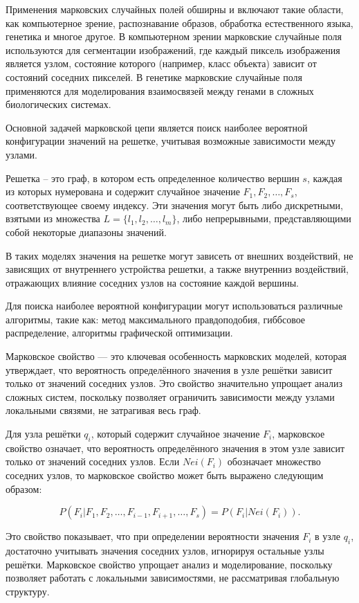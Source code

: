 Применения марковских случайных полей обширны и включают такие области, как компьютерное зрение, распознавание образов, обработка естественного языка, генетика и многое другое. В компьютерном зрении марковские случайные поля используются для сегментации изображений, где каждый пиксель изображения является узлом, состояние которого (например, класс объекта) зависит от состояний соседних пикселей. В генетике марковские случайные поля применяются для моделирования взаимосвязей между генами в сложных биологических системах.


Основной задачей марковской цепи является поиск наиболее вероятной конфигурации значений на решетке, учитывая возможные зависимости между узлами.

Решетка -- это граф, в котором есть определенное количество вершин $s$, каждая из которых нумерована и содержит случайное значение $F_1, F_2, \ldots, F_s$, соответствующее своему индексу. Эти значения могут быть либо дискретными, взятыми из множества $L = \{l_1, l_2, \ldots, l_m \}$, либо непрерывными, представляющими собой некоторые диапазоны значений.

В таких моделях значения на решетке могут зависеть от внешних воздействий, не зависящих от внутреннего устройства решетки, а также внутренниз воздействий, отражающих влияние соседних узлов на состояние каждой вершины.

Для поиска наиболее вероятной конфигурации могут использоваться различные алгоритмы, такие как: метод максимального правдоподобия, гиббсовое распределение, алгоритмы графической оптимизации.

Марковское свойство — это ключевая особенность марковских моделей, которая утверждает, что вероятность определённого значения в узле решётки зависит только от значений соседних узлов. Это свойство значительно упрощает анализ сложных систем, поскольку позволяет ограничить зависимости между узлами локальными связями, не затрагивая весь граф.

Для узла решётки $q_i$, который содержит случайное значение $F_i$, марковское свойство означает, что вероятность определённого значения в этом узле зависит только от значений соседних узлов. Если $Nei(F_i)$ обозначает множество соседних узлов, то марковское свойство может быть выражено следующим образом:

$$P(F_i | F_1, F_2, \ldots, F_{i-1}, F_{i+1}, \ldots, F_s) = P(F_i | Nei(F_i)).$$

Это свойство показывает, что при определении вероятности значения $F_i$ в узле $q_i$, достаточно учитывать значения соседних узлов, игнорируя остальные узлы решётки. Марковское свойство упрощает анализ и моделирование, поскольку позволяет работать с локальными зависимостями, не рассматривая глобальную структуру.

